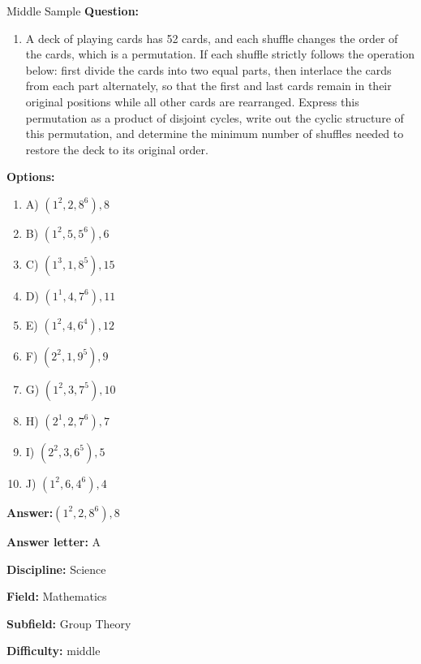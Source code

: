 \begin{middlebox}{Middle Sample}
\textbf{Question:}
\begin{enumerate}[leftmargin=0.5cm, label={}]  
\item A deck of playing cards has 52 cards, and each shuffle changes the order of the cards, which is a permutation. If each shuffle strictly follows the operation below: first divide the cards into two equal parts, then interlace the cards from each part alternately, so that the first and last cards remain in their original positions while all other cards are rearranged. Express this permutation as a product of disjoint cycles, write out the cyclic structure of this permutation, and determine the minimum number of shuffles needed to restore the deck to its original order.
\end{enumerate}


\textbf{Options:}
\begin{enumerate}[leftmargin=0.5cm, label={}]  
\item A) $(1^2, 2, 8^6), 8$
\item B) $(1^2, 5, 5^6), 6$
\item C) $(1^3, 1, 8^5), 15$
\item D) $(1^1, 4, 7^6), 11$
\item E) $(1^2, 4, 6^4), 12$
\item F) $(2^2, 1, 9^5), 9$
\item G) $(1^2, 3, 7^5), 10$
\item H) $(2^1, 2, 7^6), 7$
\item I) $(2^2, 3, 6^5), 5$
\item J) $(1^2, 6, 4^6), 4$
\end{enumerate}


\textbf{Answer:}$(1^2, 2, 8^6), 8$

\textbf{Answer letter:} A

\textbf{Discipline:} Science

\textbf{Field:} Mathematics

\textbf{Subfield:} Group Theory

\textbf{Difficulty:} middle

\end{middlebox}

